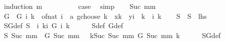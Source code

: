 \begin{isabellebody}
%
\isadelimproof
%
\endisadelimproof
%
\isatagproof
{}\isamarkupfalse%
\ {\isacharparenleft}{\kern0pt}induction\ m{\isacharparenright}{\kern0pt}\isanewline
\ \ \isamarkupfalse%
\ {}\isanewline
\ \ \isamarkupfalse%
\ \isamarkupfalse%
\ {\isacharquery}{\kern0pt}case\ \isamarkupfalse%
\ simp\isanewline
{}\isamarkupfalse%
\isanewline
\ \ \isamarkupfalse%
\ {\isacharparenleft}{\kern0pt}Suc\ mm{\isacharparenright}{\kern0pt}\isanewline
\ \ \isamarkupfalse%
\ G\ \ {\isachardoublequoteopen}G\ i\ k\ {\isacharequal}{\kern0pt}\ {\isacharparenleft}{\kern0pt}of{\isacharunderscore}{\kern0pt}nat\ i\ {\isacharplus}{\kern0pt}\ a\ gchoose\ k{\isacharparenright}{\kern0pt}\ {\isacharasterisk}{\kern0pt}\ x{\isacharcircum}{\kern0pt}k\ {\isacharasterisk}{\kern0pt}\ y{\isacharcircum}{\kern0pt}{\isacharparenleft}{\kern0pt}i\ {\isacharminus}{\kern0pt}\ k{\isacharparenright}{\kern0pt}{\isachardoublequoteclose}\ \ i\ k\isanewline
\ \ \isamarkupfalse%
\ S\ \ {\isachardoublequoteopen}S\ {\isacharequal}{\kern0pt}\ {\isacharquery}{\kern0pt}lhs{\isachardoublequoteclose}\isanewline
\ \ \isamarkupfalse%
\ SG{\isacharunderscore}{\kern0pt}def{\isacharcolon}{\kern0pt}\ {\isachardoublequoteopen}S\ {\isacharequal}{\kern0pt}\ {\isacharparenleft}{\kern0pt}{\isasymlambda}i{\isachardot}{\kern0pt}\ {\isacharparenleft}{\kern0pt}{\isasymSum}k{\isasymle}i{\isachardot}{\kern0pt}\ {\isacharparenleft}{\kern0pt}G\ i\ k{\isacharparenright}{\kern0pt}{\isacharparenright}{\kern0pt}{\isacharparenright}{\kern0pt}{\isachardoublequoteclose}\isanewline
\ \ \ \ \isamarkupfalse%
\ S{\isacharunderscore}{\kern0pt}def\ G{\isacharunderscore}{\kern0pt}def\ \isacommand{{\isachardot}{\kern0pt}{\isachardot}{\kern0pt}}\isamarkupfalse%
\isanewline
\isanewline
\ \ \isamarkupfalse%
\ {\isachardoublequoteopen}S\ {\isacharparenleft}{\kern0pt}Suc\ mm{\isacharparenright}{\kern0pt}\ {\isacharequal}{\kern0pt}\ G\ {\isacharparenleft}{\kern0pt}Suc\ mm{\isacharparenright}{\kern0pt}\ {}\ {\isacharplus}{\kern0pt}\ {\isacharparenleft}{\kern0pt}{\isasymSum}k{\isacharequal}{\kern0pt}Suc\ {}{\isachardot}{\kern0pt}{\isachardot}{\kern0pt}Suc\ mm{\isachardot}{\kern0pt}\ G\ {\isacharparenleft}{\kern0pt}Suc\ mm{\isacharparenright}{\kern0pt}\ k{\isacharparenright}{\kern0pt}{\isachardoublequoteclose}\isanewline
\ \ \ \ \isamarkupfalse%
\ SG{\isacharunderscore}{\kern0pt}def\ \isamarkupfalse%

\end{isabellebody}
